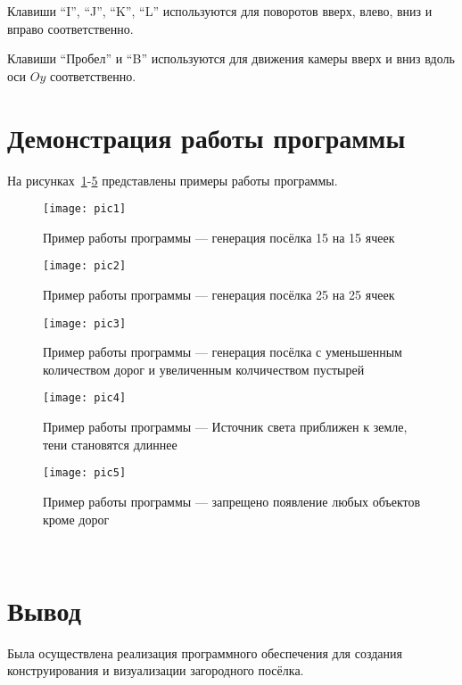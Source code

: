 Клавиши ``I'', ``J'', ``K'', ``L'' используются для поворотов вверх, влево, вниз и вправо соответственно.

Клавиши ``Пробел'' и ``B'' используются для движения камеры вверх и вниз вдоль оси $Oy$ соответственно.

\section{Демонстрация работы программы}

На рисунках~\ref{fig:example_1}-\ref{fig:example_5} представлены примеры работы программы.

\begin{figure}[h!]
  \texttt{[image: pic1]}
  \caption{Пример работы программы --- генерация посёлка 15 на 15 ячеек}
  \label{fig:example_1}
\end{figure}
\begin{figure}[h!]
  \texttt{[image: pic2]}
  \caption{Пример работы программы ---  генерация посёлка 25 на 25 ячеек}
  \label{fig:example_2}
\end{figure}
\begin{figure}[h!]
  \texttt{[image: pic3]}
  \caption{Пример работы программы --- генерация посёлка с уменьшенным количеством дорог и увеличенным колчичеством пустырей}
  \label{fig:example_3}
\end{figure}
\begin{figure}[h!]
  \texttt{[image: pic4]}
  \caption{Пример работы программы --- Источник света приближен к земле, тени становятся длиннее}
  \label{fig:example_4}
\end{figure}
\begin{figure}[h!]
  \texttt{[image: pic5]}
  \caption{Пример работы программы --- запрещено появление любых объектов кроме дорог}
  \label{fig:example_5}
\end{figure}

\newpage

\

\section{Вывод}

Была осуществлена реализация программного обеспечения для создания конструирования и визуализации загородного посёлка.